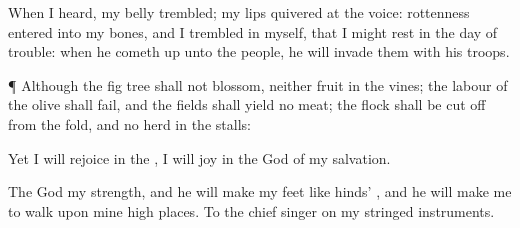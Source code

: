 {\par }{\PP {}When I
heard, my
belly
trembled; my
lips
quivered at the
voice:
rottenness
entered into my
bones, and I
trembled in myself, that I might
rest in the
day of
trouble: when he cometh
up unto the
people, he will invade them with his
troops.


\par }{\PP {}¶ Although the fig
tree shall not
blossom, neither
{}
fruit
{} in the
vines; the
labour of the
olive shall
fail, and the
fields shall
yield no
meat; the
flock shall be cut
off from the
fold, and
{} no
herd in the
stalls:

Yet I will
rejoice in the
{}, I will
joy in the
God of my
salvation.

The
{}
God
{} my
strength, and he will
make my
feet like
hinds’
{}, and he will make me to
walk upon mine high
places. To the chief
singer on my stringed
instruments.


\par }